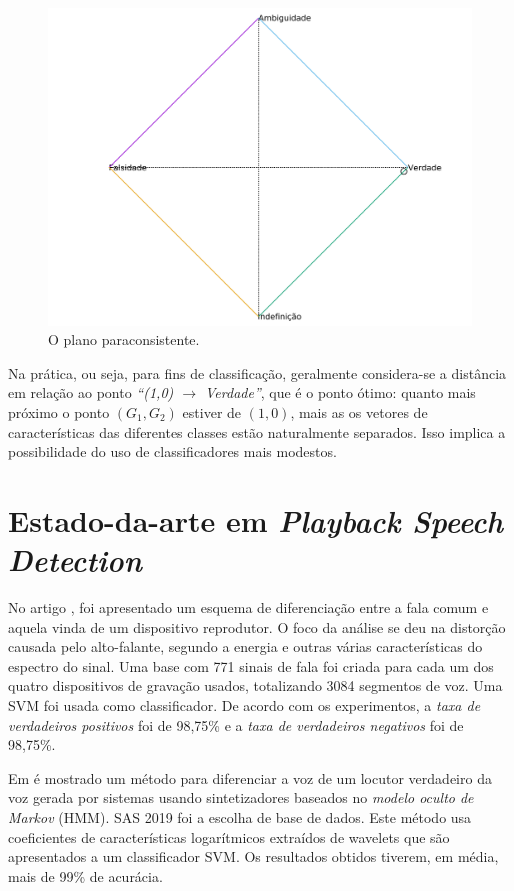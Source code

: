 			\begin{figure}[h]
				\centering
				\includegraphics[width=0.69\linewidth]{images/paraconsistentPlane.pdf}
				\caption{O plano paraconsistente.}
				\label{fig:paraconsistentplane}
			\end{figure}
		
		\par Na prática, ou seja, para fins de classificação, geralmente considera-se a distância em relação ao ponto \textit{``(1,0) $\rightarrow$ Verdade''}, que é o ponto ótimo: quanto mais próximo o ponto $(G_1,G_2)$ estiver de $(1,0)$, mais as os vetores de características das diferentes classes estão naturalmente separados. Isso implica a possibilidade do uso de classificadores mais modestos. 
		
	\section{Estado-da-arte em \textit{Playback Speech Detection}}
		\par No artigo \cite{Ren2019}, foi apresentado um esquema de diferenciação entre a fala comum e aquela vinda de um dispositivo reprodutor. O foco da análise se deu na distorção causada pelo alto-falante, segundo a energia e outras várias características do espectro do sinal. Uma base com 771 sinais de fala foi criada para cada um dos quatro dispositivos de gravação usados, totalizando 3084 segmentos de voz. Uma SVM foi usada como classificador. De acordo com os experimentos, a \textit{taxa de verdadeiros positivos} foi de 98,75\% e a \textit{taxa de verdadeiros negativos} foi de 98,75\%.
		
		\par Em \cite{DiqunYan2019} é mostrado um método para diferenciar a voz de um locutor verdadeiro da voz gerada por sistemas usando sintetizadores baseados no \textit{modelo oculto de Markov} (HMM). SAS 2019\cite{SAS2019} foi a escolha de base de dados. Este método usa coeficientes de características logarítmicos extraídos de wavelets que são apresentados a um classificador SVM. Os resultados obtidos tiverem, em média, mais de 99\% de acurácia.

